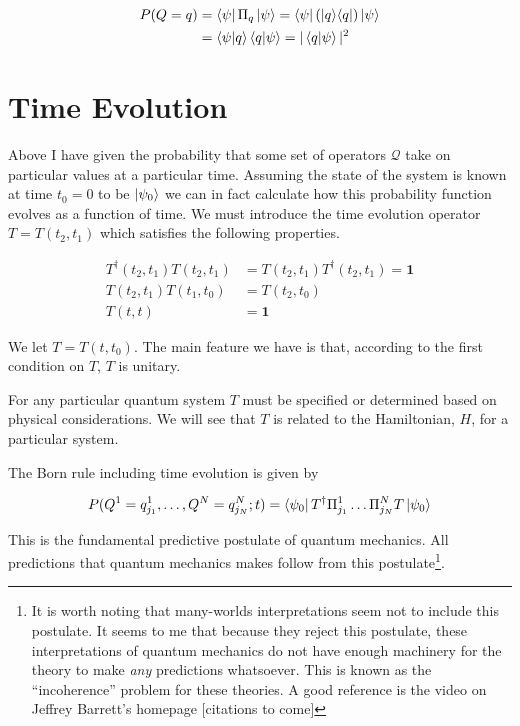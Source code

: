 \documentclass[12pt]{article}
\newcommand{\bv}[1]{\boldsymbol{#1}}
\newcommand{\ketbra}[2]{\Ket{#1}\!\Bra{#2}}
\begin{document}
\begin{align}
P(Q=q) &= \bra{\psi}\Pi_q\ket{\psi} = \bra{\psi}\left(\ketbra{q}{q}\right)\ket{\psi}\\
&= \braket{\psi|q}\braket{q|\psi} = |\braket{q|\psi}|^2
\end{align}


\section{Time Evolution}


Above I have given the probability that some set of operators $\mathcal{Q}$ take on particular values at a particular time. Assuming the state of the system is known at time $t_0 = 0$ to be $\ket{\psi_0}$ we can in fact calculate how this probability function evolves as a function of time. We must introduce the time evolution operator $T = T(t_2,t_1)$ which satisfies the following properties.

\begin{align}
T^{\dag}(t_2,t_1)T(t_2,t_1) &= T(t_2, t_1)T^{\dag}(t_2, t_1) = \bv{1}\\
T(t_2,t_1)T(t_1,t_0) &= T(t_2,t_0)\\
T(t,t) & = \bv{1}
\end{align}

We let $T=T(t,t_0)$. The main feature we have is that, according to the first condition on $T$, $T$ is unitary.

 For any particular quantum system $T$ must be specified or determined based on physical considerations. We will see that $T$ is related to the Hamiltonian, $H$, for a particular system.

The Born rule including time evolution is given by

\begin{align}
P(Q^1=q^1_{j_1},\ldots,Q^N = q^N_{j_N};t) = \bra{\psi_0} T^{\dag} \Pi^1_{j_1}\ldots \Pi^N_{j_N} T \ket{\psi_0}
\end{align}

This is the fundamental predictive postulate of quantum mechanics. All predictions that quantum mechanics makes follow from this postulate\footnote{It is worth noting that many-worlds interpretations seem not to include this postulate. It seems to me that because they reject this postulate, these interpretations of quantum mechanics do not have enough machinery for the theory to make \textit{any} predictions whatsoever. This is known as the ``incoherence'' problem for these theories. A good reference is the video on Jeffrey Barrett's homepage [citations to come]}.
\end{document}
